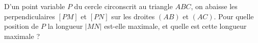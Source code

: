 D'un point variable $P$ du cercle circonscrit au triangle $ABC$, on abaisse les perpendiculaires $[PM]$ et $[PN]$ sur les droites $(AB)$ et $(AC)$. Pour quelle position de $P$ la longueur $|MN|$ est-elle maximale, et quelle est cette longueur maximale ?
